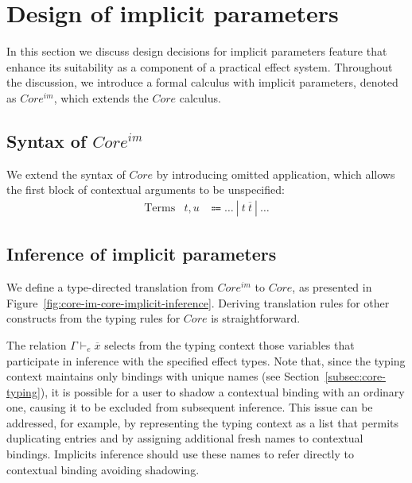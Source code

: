 \documentclass[acmsmall,review,screen]{acmart}
\newcommand{\vor}{~|~}
\newcommand{\ap}{~}
\begin{document}
\section{Design of implicit parameters} \label{sec:implicits}

In this section we discuss design decisions for implicit parameters feature that enhance its suitability as a component of a practical effect system.
Throughout the discussion, we introduce a formal calculus with implicit parameters, denoted as $Core^{im}$, which extends the $Core$ calculus.

\subsection{Syntax of $Core^{im}$}

We extend the syntax of $Core$ by introducing omitted application, which allows the first block of contextual arguments to be unspecified:
\[
    \begin{array}{lcc}
        \text{Terms} & t, u &\Coloneqq \ldots \vor t\ap\overline{t} \vor \ldots
    \end{array}
\]

\subsection{Inference of implicit parameters} \label{subsec:inference}

We define a type-directed translation from $Core^{im}$ to $Core$, as presented in Figure~\ref{fig:core-im-core-implicit-inference}.
Deriving translation rules for other constructs from the typing rules for $Core$ is straightforward.

The relation $\Gamma\vdash_e \overline{x}$ selects from the typing context those variables that participate in inference with the specified effect types.
Note that, since the typing context maintains only bindings with unique names (see Section\ \ref{subsec:core-typing}), it is possible for a user to shadow a contextual binding with an ordinary one, causing it to be excluded from subsequent inference.
This issue can be addressed, for example, by representing the typing context as a list that permits duplicating entries and by assigning additional fresh names to contextual bindings.
Implicits inference should use these names to refer directly to contextual binding avoiding shadowing.
\end{document}

